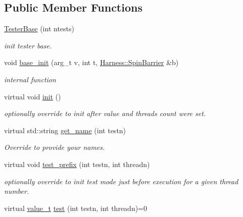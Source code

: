 \subsection*{Public Member Functions}
\begin{DoxyCompactItemize}
\item 
\hyperlink{classTesterBase_ace45830020ea18f7847faa2eb757f9fc}{Tester\+Base} (int ntests)
\begin{DoxyCompactList}\small\item\em init tester base. \end{DoxyCompactList}\item 
\hypertarget{classTesterBase_aaaca975185011c1d4bfffbde2b153936}{}void \hyperlink{classTesterBase_aaaca975185011c1d4bfffbde2b153936}{base\+\_\+init} (arg\+\_\+t v, int t, \hyperlink{classHarness_1_1SpinBarrier}{Harness\+::\+Spin\+Barrier} \&b)\label{classTesterBase_aaaca975185011c1d4bfffbde2b153936}

\begin{DoxyCompactList}\small\item\em internal function \end{DoxyCompactList}\item 
\hypertarget{classTesterBase_a3c84ff308ec38fa49f89109d18d61e2a}{}virtual void \hyperlink{classTesterBase_a3c84ff308ec38fa49f89109d18d61e2a}{init} ()\label{classTesterBase_a3c84ff308ec38fa49f89109d18d61e2a}

\begin{DoxyCompactList}\small\item\em optionally override to init after value and threads count were set. \end{DoxyCompactList}\item 
\hypertarget{classTesterBase_a7f3417f782fc30d35c34b91d976fbfe4}{}virtual std\+::string \hyperlink{classTesterBase_a7f3417f782fc30d35c34b91d976fbfe4}{get\+\_\+name} (int testn)\label{classTesterBase_a7f3417f782fc30d35c34b91d976fbfe4}

\begin{DoxyCompactList}\small\item\em Override to provide your names. \end{DoxyCompactList}\item 
\hypertarget{classTesterBase_a49fe38263c8f9fbfb8bc385220903012}{}virtual void \hyperlink{classTesterBase_a49fe38263c8f9fbfb8bc385220903012}{test\+\_\+prefix} (int testn, int threadn)\label{classTesterBase_a49fe38263c8f9fbfb8bc385220903012}

\begin{DoxyCompactList}\small\item\em optionally override to init test mode just before execution for a given thread number. \end{DoxyCompactList}\item 
\hypertarget{classTesterBase_aebc1085725f77fc35803a131c484cbe7}{}virtual \hyperlink{classvalue__t}{value\+\_\+t} \hyperlink{classTesterBase_aebc1085725f77fc35803a131c484cbe7}{test} (int testn, int threadn)=0\label{classTesterBase_aebc1085725f77fc35803a131c484cbe7}


\end{DoxyCompactItemize}
